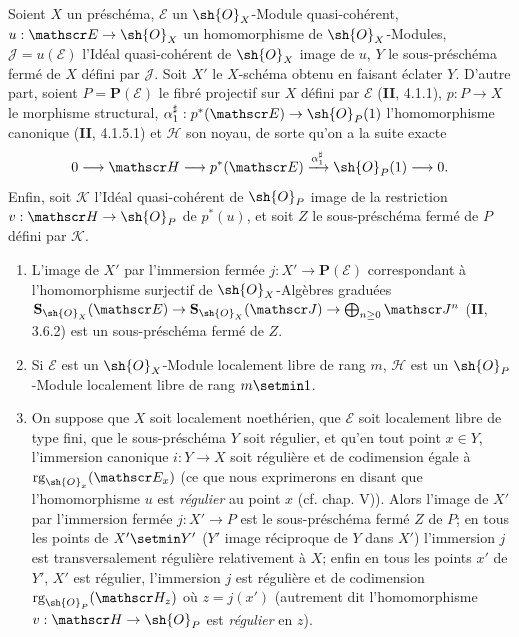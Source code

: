 \begin{proposition}[19.4.11]
Soient $X$ un préschéma, $\mathscr E$ un $\sh{O}_X$-Module quasi-cohérent, $u:\mathscr E\to\sh{O}_X$ un homomorphisme de $\sh{O}_X$-Modules, $\mathscr J=u(\mathscr E)$ l'Idéal quasi-cohérent de $\sh{O}_X$ image de $u$, $Y$ le sous-préschéma fermé de $X$ défini par $\mathscr J$. Soit $X'$ le $X$-schéma obtenu en faisant éclater $Y$. D'autre part, soient $P=\mathbf P(\mathscr E)$ le fibré projectif sur $X$ défini par $\mathscr E$ \textup{(\textbf{II}, 4.1.1)}, $p:P\to X$ le morphisme structural, $\alpha_1^{\sharp}:p^*(\mathscr E)\to\sh{O}_P(1)$ l'homomorphisme canonique \textup{(\textbf{II}, 4.1.5.1)} et $\mathscr H$ son noyau, de sorte qu'on a la suite exacte
\[
  0\longrightarrow\mathscr H\longrightarrow p^*(\mathscr E)\xrightarrow{\alpha_1^{\sharp}}\sh{O}_P(1)\longrightarrow0.
\]
Enfin, soit $\mathscr K$ l'Idéal quasi-cohérent de $\sh{O}_P$ image de la restriction $v:\mathscr H\to\sh{O}_P$ de $p^*(u)$, et soit $Z$ le sous-préschéma fermé de $P$ défini par $\mathscr K$.


\begin{enumerate}
  \item[\textup{(i)}] L'image de $X'$ par l'immersion fermée $j:X'\to\mathbf P(\mathscr E)$ correspondant à l'homomorphisme surjectif de $\sh{O}_X$-Algèbres graduées $\mathbf S_{\sh{O}_X}(\mathscr E)\to\mathbf S_{\sh{O}_X}(\mathscr J)\to\bigoplus_{n\geq0}\mathscr J^n$ \textup{(\textbf{II}, 3.6.2)} est un sous-préschéma fermé de $Z$.
  \item[\textup{(ii)}] Si $\mathscr E$ est un $\sh{O}_X$-Module localement libre de rang $m$, $\mathscr H$ est un $\sh{O}_P$-Module localement libre de rang $m\setmin 1$.
  \item[\textup{(iii)}] On suppose que $X$ soit localement noethérien, que $\mathscr E$ soit localement libre de type fini, que le sous-préschéma $Y$ soit régulier, et qu'en tout point $x\in Y$, l'immersion canonique $i:Y\to X$ soit régulière et de codimension égale à $\operatorname{rg}_{\sh{O}_x}(\mathscr E_x)$ \textup{(ce que nous exprimerons en disant que l'homomorphisme $u$ est \emph{régulier} au point $x$ (cf. chap. V))}. Alors l'image de $X'$ par l'immersion fermée $j:X'\to P$ est le sous-préschéma fermé $Z$ de $P$; en tous les points de $X'\setmin Y'$ \textup{(}$Y'$ image réciproque de $Y$ dans $X'$\textup{)} l'immersion $j$ est transversalement régulière relativement à $X$; enfin en tous les points $x'$ de $Y'$, $X'$ est régulier, l'immersion $j$ est régulière et de codimension $\operatorname{rg}_{\sh{O}_P}(\mathscr H_z)$ où $z=j(x')$ \textup{(autrement dit l'homomorphisme $v:\mathscr H\to\sh{O}_P$ est \emph{régulier} en $z$)}.
\end{enumerate}
\end{proposition}

